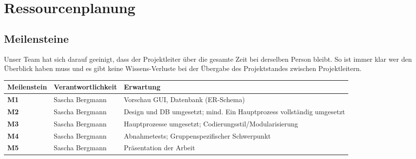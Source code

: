 \section{Ressourcenplanung}
\subsection{Meilensteine}
Unser Team hat sich darauf geeinigt, dass der Projektleiter über die gesamte Zeit bei derselben Person bleibt.
So ist immer klar wer den Überblick haben muss und es gibt keine Wissens-Verluste bei der Übergabe des Projektstandes zwischen Projektleitern. 

\begin{tabularx}{\textwidth-2cm}{|l|l|X|} \hline
\textbf{Meilenstein}	& \textbf{Verantwortlichkeit} &	\textbf{Erwartung} \\ \hline
\textbf{M1}	&Sascha Bergmann	&Vorschau GUI, Datenbank (ER-Schema) \\  \hline
\textbf{M2}	&Sascha Bergmann	&Design und DB umgesetzt; mind. Ein Hauptprozess vollständig umgesetzt \\ \hline
\textbf{M3}	&Sascha Bergmann	&Hauptprozesse umgesetzt; Codierungsstil/Modularisierung \\ \hline
\textbf{M4}	&Sascha Bergmann	&Abnahmetests; Gruppenspezifischer Schwerpunkt \\ \hline
\textbf{M5}	&Sascha Bergmann	&Präsentation der Arbeit \\ \hline
\end{tabularx}